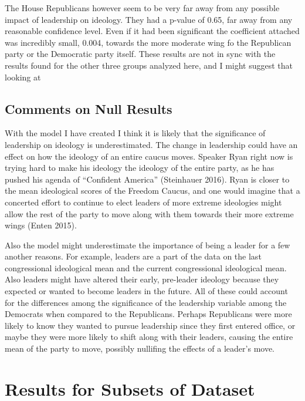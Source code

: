 \documentclass[12pt,twoside]{reedthesis}
\begin{document}
  The House Republicans however seem to be very far away from any possible
  impact of leadership on ideology. They had a p-value of 0.65, far away
  from any reasonable confidence level. Even if it had been significant
  the coefficient attached was incredibly small, 0.004, towards the more
  moderate wing fo the Republican party or the Democratic party itself.
  These results are not in sync with the results found for the other three
  groups analyzed here, and I might suggest that looking at
  
  \subsection{Comments on Null Results}\label{comments-on-null-results}
  
  With the model I have created I think it is likely that the significance
  of leadership on ideology is underestimated. The change in leadership
  could have an effect on how the ideology of an entire caucus moves.
  Speaker Ryan right now is trying hard to make his ideology the ideology
  of the entire party, as he has pushed his agenda of ``Confident
  America'' (Steinhauer 2016). Ryan is closer to the mean ideological
  scores of the Freedom Caucus, and one would imagine that a concerted
  effort to continue to elect leaders of more extreme ideologies might
  allow the rest of the party to move along with them towards their more
  extreme wings (Enten 2015).
  
  Also the model might underestimate the importance of being a leader for
  a few another reasons. For example, leaders are a part of the data on
  the last congressional ideological mean and the current congressional
  ideological mean. Also leaders might have altered their early,
  pre-leader ideology because they expected or wanted to become leaders in
  the future. All of these could account for the differences among the
  significance of the leadership variable among the Democrats when
  compared to the Republicans. Perhaps Republicans were more likely to
  know they wanted to pursue leadership since they first entered office,
  or maybe they were more likely to shift along with their leaders,
  causing the entire mean of the party to move, possibly nullifing the
  effects of a leader's move.
  
  \section{Results for Subsets of
  Dataset}\label{results-for-subsets-of-dataset}
  
\end{document}

